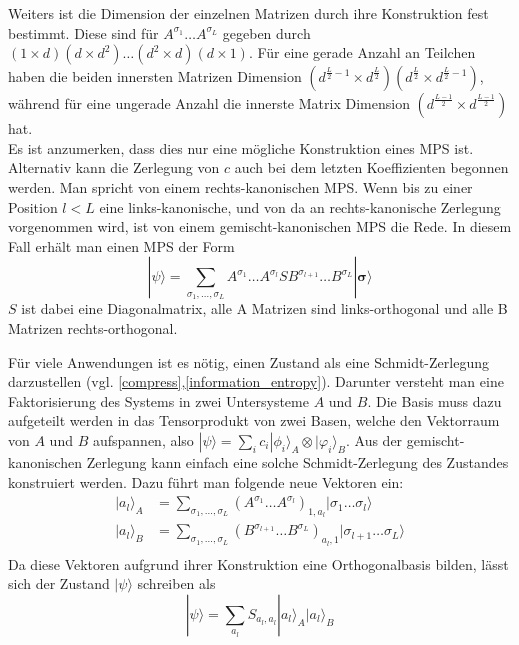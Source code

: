 \documentclass[10pt,a4paper]{report}
\newcommand{\SumIndex}{\sigma_1,\ldots,\sigma_L}
\begin{document}
Weiters ist die Dimension der einzelnen Matrizen durch ihre Konstruktion fest bestimmt. Diese sind für $A^{\sigma_1}\ldots A^{\sigma_L}$ gegeben durch $(1\times d)(d\times d^2)\ldots(d^2\times d)(d\times 1)$. Für eine gerade Anzahl an Teilchen haben die beiden innersten Matrizen Dimension $(d^{\frac{L}{2}-1}\times d^{\frac{L}{2}})(d^{\frac{L}{2}}\times d^{\frac{L}{2}-1})$, während für eine ungerade Anzahl die innerste Matrix Dimension $(d^{\frac{L-1}{2}}\times d^{\frac{L-1}{2}})$ hat.\\

Es ist anzumerken, dass dies nur eine mögliche Konstruktion eines MPS ist. Alternativ kann die Zerlegung von $c$ auch bei dem letzten Koeffizienten begonnen werden. Man spricht von einem rechts-kanonischen MPS. Wenn bis zu einer Position $l<L$ eine links-kanonische, und von da an rechts-kanonische Zerlegung vorgenommen wird, ist von einem gemischt-kanonischen MPS die Rede. In diesem Fall erhält man einen MPS der Form
\begin{equation}
|\psi\rangle=\sum_{\SumIndex}A^{\sigma_1}\ldots A^{\sigma_l}S B^{\sigma_{l+1}}\ldots B^{\sigma_L}|\bm{\sigma}\rangle
\end{equation}
$S$ ist dabei eine Diagonalmatrix, alle A Matrizen sind links-orthogonal und alle B Matrizen rechts-orthogonal.

Für viele Anwendungen ist es nötig, einen Zustand als eine Schmidt-Zerlegung darzustellen (vgl. \ref{compress},\ref{information_entropy}). Darunter versteht man eine Faktorisierung des Systems in zwei Untersysteme $A$ und $B$. Die Basis muss dazu aufgeteilt werden in das Tensorprodukt von zwei Basen, welche den Vektorraum von $A$ und $B$ aufspannen, also $|\psi\rangle=\sum_i c_i|\phi_i\rangle_A\otimes|\varphi_i\rangle_B$. Aus der gemischt-kanonischen Zerlegung kann einfach eine solche Schmidt-Zerlegung des Zustandes konstruiert werden. Dazu führt man folgende neue Vektoren ein:
\begin{equation}
\begin{split}
|a_l\rangle_A&=\sum_{\SumIndex}(A^{\sigma_1}\ldots A^{\sigma_l})_{1,a_l}|\sigma_1\ldots\sigma_l\rangle \\
|a_l\rangle_B&=\sum_{\SumIndex}(B^{\sigma_{l+1}}\ldots B^{\sigma_L})_{a_l,1}|\sigma_{l+1}\ldots\sigma_L\rangle\\
\end{split}
\end{equation}
Da diese Vektoren aufgrund ihrer Konstruktion eine Orthogonalbasis bilden, lässt sich der Zustand $|\psi\rangle$ schreiben als
\begin{equation}\label{MPS_Schmidt_equ}
|\psi\rangle=\sum_{a_l}S_{a_l,a_l}|a_l\rangle_A|a_l\rangle_B
\end{equation}
\end{document}
